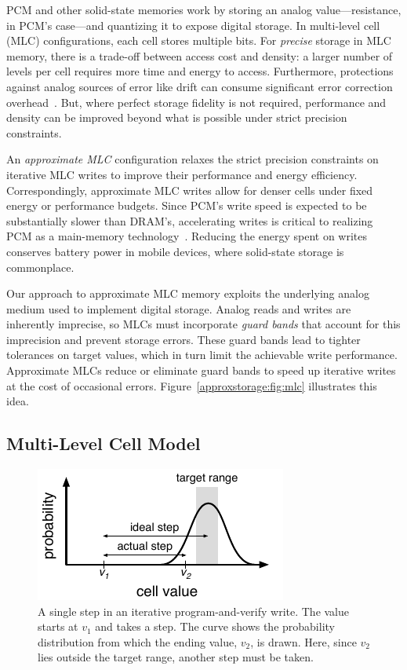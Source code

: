 PCM and other solid-state memories
work by storing an analog value---resistance, in PCM's case---and quantizing it to expose digital
storage. In multi-level cell (MLC) configurations, each cell stores
multiple bits. For \emph{precise} storage in MLC memory,
there is a trade-off between access cost and density: a larger number
of levels per cell requires more time and energy to access.
Furthermore, protections against analog sources of error like drift can consume
significant error correction overhead~\cite{drifttolerant}.
But, where perfect storage fidelity is not required,
performance and density can be improved beyond what is possible under
strict precision constraints.

An \emph{approximate MLC} configuration relaxes the strict precision
constraints on iterative MLC writes to improve their performance and energy
efficiency. Correspondingly, approximate MLC writes allow for denser cells
under fixed energy or performance budgets. Since PCM's write speed is expected
to be substantially slower than DRAM's, accelerating writes is critical to
realizing PCM as a main-memory technology~\cite{pcm-dram-alt}.
Reducing the energy
spent on writes conserves battery power in mobile devices, where
solid-state storage is commonplace.

Our approach to approximate MLC memory exploits the underlying
analog medium used to implement digital storage. Analog reads and
writes are inherently imprecise, so MLCs must incorporate \emph{guard
bands} that account for this imprecision and prevent storage errors.
These guard bands lead to tighter tolerances on target values, which in turn limit
the achievable write performance.
Approximate MLCs reduce or eliminate guard bands to speed up
iterative writes at the cost of occasional errors.
Figure~\ref{approxstorage:fig:mlc} illustrates this idea.

\subsection{Multi-Level Cell Model}
\label{approxstorage:sec:mlcmodel}

\begin{figure}
    \centering
    \includegraphics[scale=1.1]{figs/mlc-step}
    \caption{
        A single step in an iterative program-and-verify write. The value
        starts at $v_1$ and takes a step. The curve shows the probability
        distribution from which the ending value, $v_2$, is drawn. Here, since
        $v_2$ lies outside the target range, another step must be taken.
    }
    \label{approxstorage:fig:mlc-step}
\end{figure}

